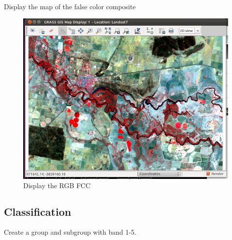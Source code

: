 Display the map of the false color composite

\begin{figure}[htbp]
   \centering
   \includegraphics[scale=0.35]{grass_rs007.png}
   \caption{Display the RGB FCC}
   \label{fig:grass_rs007}
\end{figure}

\subsection{Classification}
\label{classification}

Create a group and subgroup with band 1-5.

